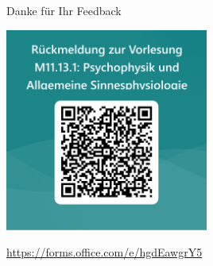 \documentclass{beamer}
\begin{document}
\begin{frame}{Danke für Ihr Feedback}

\begin{center}
    \includegraphics[width=0.5\textwidth]{feedback_QR.png}
\end{center}

\url{https://forms.office.com/e/hgdEawgrY5}

\end{frame}
\end{document}
